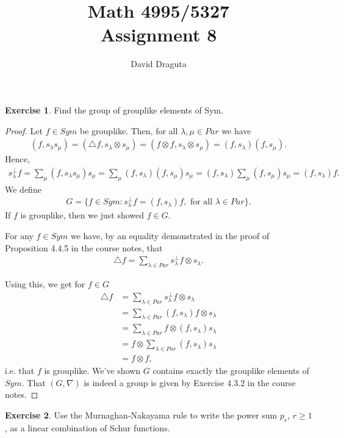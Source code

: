 \documentclass[12pt]{extarticle}
\title{ Math 4995/5327
  \\
  Assignment 8}
\author{David Draguta}
\newcommand{\set}[1]{\{#1\}}
\newcommand{\<}{\langle}
\renewcommand{\>}{\rangle}
\theoremstyle{definition}
\newtheorem{exercise}{Exercise}
\begin{document}
\maketitle

\begin{exercise}
  Find the group of grouplike elements of Sym.
\end{exercise}
\begin{proof}
  Let $f \in Sym$ be grouplike. Then, for all $\lambda, \mu \in Par$ we have
  \begin{align*}
    (f, s_{\lambda} s_{\mu}) = (\triangle f, s_{\lambda} \otimes s_{\mu}) = (f \otimes f, s_{\lambda} \otimes s_{\mu}) = (f, s_{\lambda})(f, s_\mu).
  \end{align*}
  Hence,
  \begin{align*}
    s_{\lambda}^{\perp} f = \sum\limits_{\mu} (f, s_\lambda s_\mu) s_{\mu} =  \sum\limits_{\mu} (f, s_{\lambda})(f, s_\mu)s_{\mu} =  (f, s_{\lambda})\sum\limits_{\mu}(f, s_\mu)s_{\mu} = (f,s_\lambda)f.
  \end{align*}
  We define
  \begin{align*}
    G = \set{f \in Sym: s_\lambda^{\perp} f = (f,s_\lambda)f, \text{ for all } \lambda \in Par}.
  \end{align*}
  If $f$ is grouplike, then we just showed $f \in G$.

  For any $f \in Sym$ we have, by an equality demonstrated in the proof of Proposition 4.4.5 in the course notes, that
  \begin{align*}
    \triangle f = \sum\limits_{\lambda \in Par} s_\lambda^{\perp}f \otimes s_{\lambda}.
  \end{align*}

  Using this, we get for $f \in G$
  \begin{align*}
    \triangle f
    &= 
    \sum\limits_{\lambda \in Par} s_\lambda^{\perp}f \otimes s_{\lambda} \\
    &=  \sum\limits_{\lambda \in Par} (f,s_\lambda)f \otimes s_{\lambda} \\
    &=  \sum\limits_{\lambda \in Par} f \otimes (f,s_\lambda)s_{\lambda} \\
    &= f \otimes \sum\limits_{\lambda \in Par}(f,s_\lambda)s_{\lambda} \\
    &=
    f \otimes f,
  \end{align*}
  i.e. that $f$ is grouplike. We've shown $G$ contains exactly the grouplike elements of $Sym$. That $(G, \nabla)$ is indeed a group is given by Exercise 4.3.2 in the course notes.
\end{proof}
\begin{exercise}
  Use the Murnaghan-Nakayama rule to write the power sum $p_r$, $r \geq 1$, as a linear combination of Schur functions.
\end{exercise}
\end{document}
